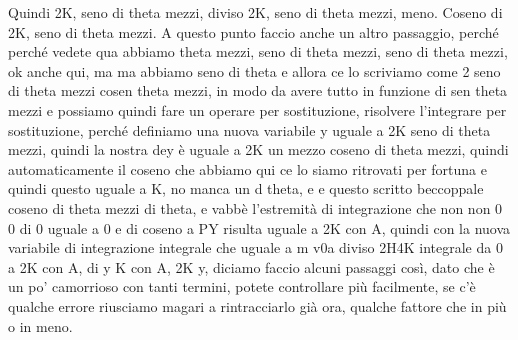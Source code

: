 \begin{soluzione}
{   Quindi 2K, seno di theta mezzi, diviso 2K, seno di theta mezzi, meno. Coseno di 2K, seno di theta mezzi. A questo punto faccio anche un altro passaggio, perché perché vedete qua abbiamo theta mezzi, seno di theta mezzi, seno di theta mezzi, ok anche qui, ma ma abbiamo seno di theta e allora ce lo scriviamo come 2 seno di theta mezzi cosen theta mezzi, in modo da avere tutto in funzione di sen theta mezzi e possiamo quindi fare un operare per sostituzione, risolvere l'integrare per sostituzione, perché definiamo una nuova variabile y uguale a 2K seno di theta mezzi, quindi la nostra dey è uguale a 2K un mezzo coseno di theta mezzi, quindi automaticamente il coseno che abbiamo qui ce lo siamo ritrovati per fortuna e quindi questo uguale a K, no manca un d theta, e e questo scritto beccoppale coseno di theta mezzi di theta, e vabbè l'estremità di integrazione che non non 0 0 di 0 uguale a 0 e di coseno a PY risulta uguale a 2K con A, quindi con la nuova variabile di integrazione integrale che uguale a m v0a diviso 2H4K integrale da 0 a 2K con A, di y K con A, 2K y, diciamo faccio alcuni passaggi così, dato che è un po' camorrioso con tanti termini, potete controllare più facilmente, se c'è qualche errore riusciamo magari a rintracciarlo già ora, qualche fattore che in più o in meno. 
   
}
\end{soluzione}

